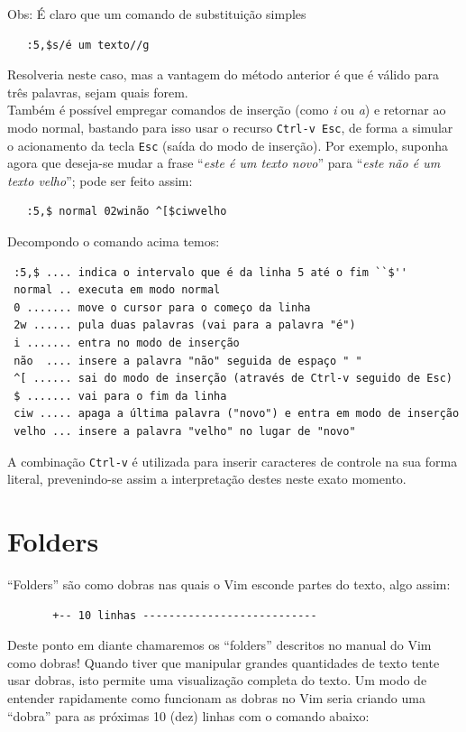 \documentclass[10pt,a4paper,openany]{book}
\begin{document}
Obs: É claro que um comando de substituição simples

\begin{verbatim}
   :5,$s/é um texto//g
\end{verbatim}

Resolveria neste caso, mas a vantagem do método anterior é que
é válido para três palavras, sejam quais forem.\\

Também é possível empregar comandos de inserção (como {\em i} ou {\em a}) e
retornar ao modo normal, bastando para isso usar o recurso \verb|Ctrl-v Esc|,
de forma a simular o acionamento da tecla \verb|Esc| (saída do modo de
inserção). Por exemplo, suponha agora que deseja-se mudar a frase ``{\em este
é um texto novo}'' para ``{\em este não é um texto velho}''; pode ser feito
assim:

\begin{verbatim}
   :5,$ normal 02winão ^[$ciwvelho
\end{verbatim}

Decompondo o comando acima temos:

\begin{verbatim}
 :5,$ .... indica o intervalo que é da linha 5 até o fim ``$''
 normal .. executa em modo normal
 0 ....... move o cursor para o começo da linha
 2w ...... pula duas palavras (vai para a palavra "é")
 i ....... entra no modo de inserção
 não  .... insere a palavra "não" seguida de espaço " "
 ^[ ...... sai do modo de inserção (através de Ctrl-v seguido de Esc)
 $ ....... vai para o fim da linha
 ciw ..... apaga a última palavra ("novo") e entra em modo de inserção
 velho ... insere a palavra "velho" no lugar de "novo"
\end{verbatim}

A combinação \verb|Ctrl-v| é utilizada para inserir caracteres de controle na
sua forma literal, prevenindo-se assim a interpretação destes neste exato
momento.
\chapter{Folders}\label{cha:Folders}
``Folders'' são como dobras nas quais o Vim esconde partes do texto,
algo assim:

\begin{verbatim}
	   +-- 10 linhas ---------------------------
\end{verbatim}

Deste ponto em diante chamaremos os ``folders'' descritos no manual do
Vim como dobras!  Quando tiver que manipular grandes quantidades de
texto tente usar dobras, isto permite uma visualização completa do
texto.  Um modo de entender rapidamente como funcionam as dobras no
Vim seria criando uma ``dobra'' para as próximas 10 (dez) linhas com o
comando abaixo:
\end{document}
